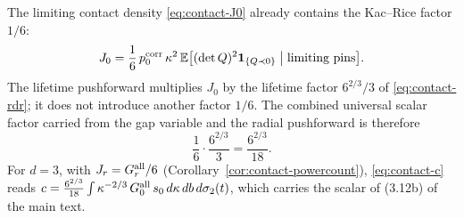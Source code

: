 \begin{remark}\label{rem:contact-nodouble}
The limiting contact density \eqref{eq:contact-J0} already contains the Kac--Rice factor $1/6$:
\[
J_0=\frac16\,p^{\rm corr}_0\,\kappa^2\,\mathbb E\bigl[(\det Q)^2\mathbf 1_{\{Q\prec0\}}\bigm|\text{limiting pins}\bigr].
\]
The lifetime pushforward multiplies $J_0$ by the lifetime factor $6^{2/3}/3$ of \eqref{eq:contact-rdr}; it does not introduce another factor $1/6$. The combined universal scalar factor carried from the gap variable and the radial pushforward is therefore
\begin{equation}\label{eq:contact-scalar}
\frac16\cdot\frac{6^{2/3}}3=\frac{6^{2/3}}{18}.
\end{equation}
For $d=3$, with $J_r=G^{\rm all}_r/6$ (Corollary~\ref{cor:contact-powercount}), \eqref{eq:contact-c} reads $c=\frac{6^{2/3}}{18}\int\kappa^{-2/3}\,G^{\rm all}_0\,s_0\,d\kappa\,db\,d\sigma_2(t)$, which carries the scalar of (3.12b) of the main text.
\end{remark}
